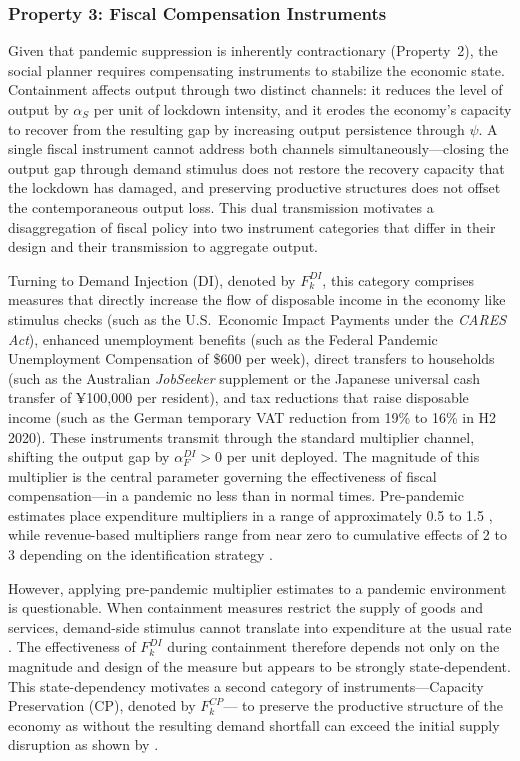 

\subsubsection*{Property 3: Fiscal Compensation Instruments}

Given that pandemic suppression is inherently contractionary (Property~2), the social planner requires compensating instruments to stabilize the economic state. Containment affects output through two distinct channels: it reduces the level of output by $\alpha_S$ per unit of lockdown intensity, and it erodes the economy's capacity to recover from the resulting gap by increasing output persistence through $\psi$.  A single fiscal instrument cannot address both channels simultaneously---closing the output gap through demand stimulus does not restore the recovery capacity that the lockdown has damaged, and preserving productive structures does not offset the contemporaneous output loss. This dual transmission motivates a disaggregation of fiscal policy into two instrument categories that differ in their design and their transmission to aggregate output.

Turning to Demand Injection (DI), denoted by $F_k^{DI}$, this category comprises measures that directly increase the flow of disposable income in the economy like stimulus checks (such as the U.S.\ Economic Impact Payments under the \textit{CARES Act}), enhanced unemployment benefits (such as the Federal Pandemic Unemployment Compensation of \$600 per week), direct transfers to households (such as the Australian \textit{JobSeeker} supplement or the Japanese universal cash transfer of
¥100,000 per resident), and tax reductions that raise disposable income (such as the German temporary VAT reduction from 19\% to 16\% in H2 2020). These instruments transmit through the standard multiplier channel, shifting the output gap by $\alpha_F^{DI} > 0$ per unit deployed. The magnitude of this multiplier is the central parameter governing the effectiveness of fiscal
compensation---in a pandemic no less than in normal times. Pre-pandemic estimates place expenditure multipliers in a range of approximately 0.5 to 1.5 \citep{ramey2018, blanchard2002}, while revenue-based multipliers range from near zero to cumulative effects of 2 to 3 depending on the identification strategy \citep{blanchard2002, romer2010}.

However, applying pre-pandemic multiplier estimates to a pandemic environment is questionable. When containment measures restrict the supply of goods and services, demand-side stimulus cannot translate into expenditure at the usual rate \citep{chetty2020, coibion2020, fariecastro2021, bayer2023c}. The effectiveness of $F_k^{DI}$ during containment therefore depends not only on the magnitude and design of the measure but appears to be strongly state-dependent. This state-dependency motivates a second category of instruments---Capacity Preservation (CP), denoted by $F_k^{CP}$--- to preserve the productive structure of the economy as without the resulting demand shortfall can exceed the initial supply disruption as shown by \citep{guerrieri2022}.

